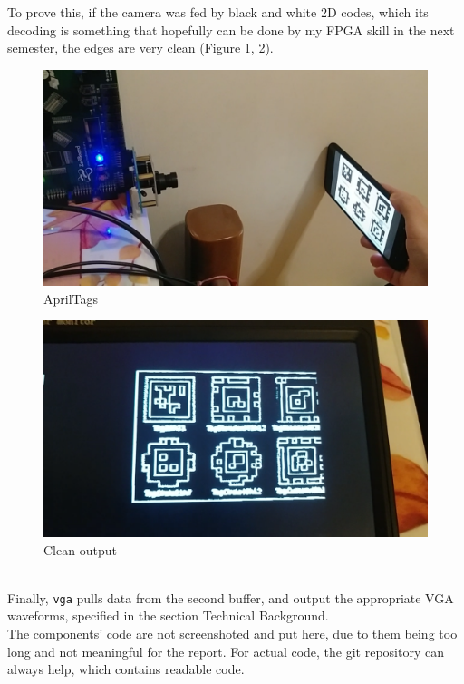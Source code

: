 \documentclass{article}
\begin{document}
	 To prove this, if the camera was fed by black and white 2D codes, which its decoding is something that hopefully can be done by my FPGA skill in the next semester, the edges are very clean (Figure \ref{fig:real5}, \ref{fig:real6}).
\begin{figure}[h]
		\centering
		\includegraphics[scale=0.15]{real5}
		\caption{AprilTags}
		\label{fig:real5}
	\end{figure}
\begin{figure}[h]
		\centering
		\includegraphics[scale=0.15]{real6}
		\caption{Clean output}
		\label{fig:real6}
	\end{figure}
	\\
	
	Finally, \texttt{vga} pulls data from the second buffer, and output the appropriate VGA waveforms, specified in the section Technical Background.
	\\
	
	The components' code are not screenshoted and put here, due to them being too long and not meaningful for the report. For actual code, the git repository can always help, which contains readable code.
	\\
	
\end{document}
